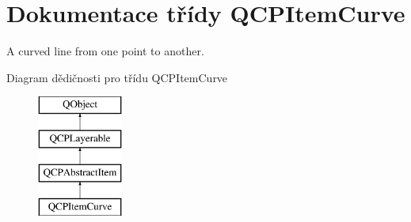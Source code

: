 \hypertarget{classQCPItemCurve}{}\section{Dokumentace třídy Q\+C\+P\+Item\+Curve}
\label{classQCPItemCurve}


A curved line from one point to another.  


Diagram dědičnosti pro třídu Q\+C\+P\+Item\+Curve\begin{figure}[H]
\begin{center}
\leavevmode
\includegraphics[height=4.000000cm]{classQCPItemCurve}
\end{center}
\end{figure}
